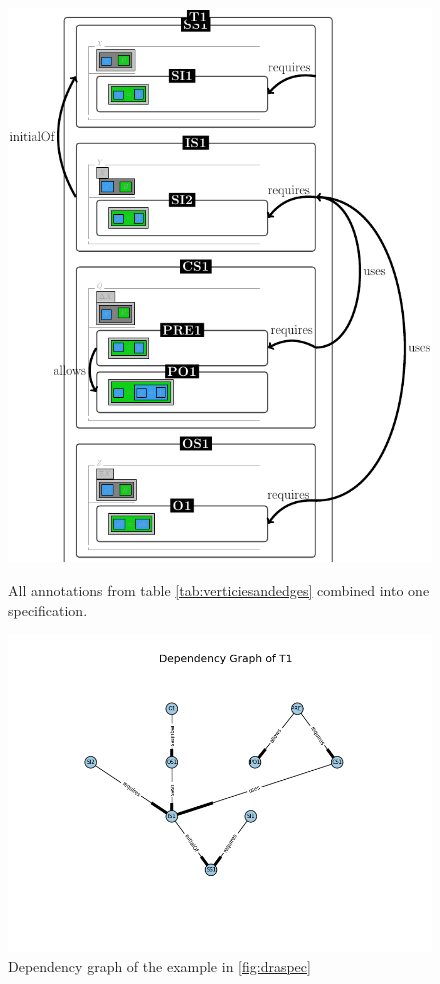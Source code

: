 \begin{figure}[H]
\centering
\begin{minipage}{0.45\textwidth}
\centering
\includegraphics[scale=0.18]{Figures/Formalising/draspec.png}
\caption{All annotations from table \ref{tab:verticiesandedges} combined into one specification.  \label{fig:draspec}}
\end{minipage}\hfill
\begin{minipage}{0.5\textwidth}
\centering
\includegraphics[scale=0.5]{Figures/Formalising/dp_text.png}
\vspace{-1.1in}
\caption{Dependency graph of the example in \ref{fig:draspec} \label{fig:draspecdep}}
\end{minipage}
\end{figure}

